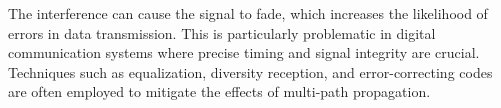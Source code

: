 The interference can cause the signal to fade, which increases the likelihood of errors in data transmission. This is particularly problematic in digital communication systems where precise timing and signal integrity are crucial. Techniques such as equalization, diversity reception, and error-correcting codes are often employed to mitigate the effects of multi-path propagation.

